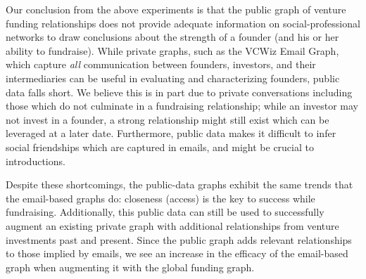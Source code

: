 Our conclusion from the above experiments is that the public graph of venture funding relationships does not provide adequate information on social-professional networks to draw conclusions about the strength of a founder (and his or her ability to fundraise). While private graphs, such as the VCWiz Email Graph, which capture \textit{all} communication between founders, investors, and their intermediaries can be useful in evaluating and characterizing founders, public data falls short. We believe this is in part due to private conversations including those which do not culminate in a fundraising relationship; while an investor may not invest in a founder, a strong relationship might still exist which can be leveraged at a later date. Furthermore, public data makes it difficult to infer social friendships which are captured in emails, and might be crucial to introductions.

Despite these shortcomings, the public-data graphs exhibit the same trends that the email-based graphs do: closeness (access) is the key to success while fundraising. Additionally, this public data can still be used to successfully augment an existing private graph with additional relationships from venture investments past and present. Since the public graph adds relevant relationships to those implied by emails, we see an increase in the efficacy of the email-based graph when augmenting it with the global funding graph.
